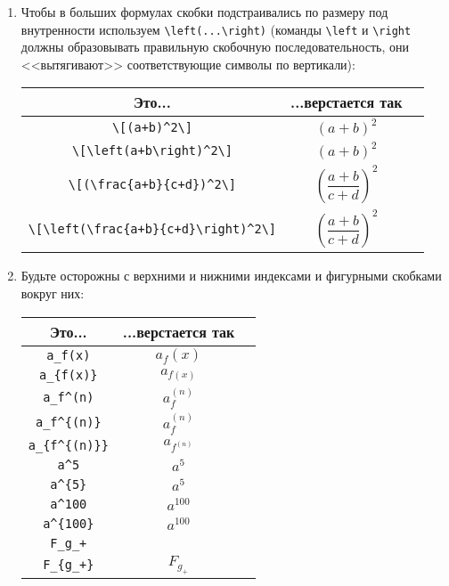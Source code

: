 \begin{enumerate}
\item
	Чтобы в больших формулах скобки подстраивались по размеру под внутренности
	используем \verb'\left(...\right)'
	(команды \verb'\left' и \verb'\right' должны образовывать правильную скобочную последовательность,
	они <<вытягивают>> соответствующие символы по вертикали):
	\begin{center}\begin{tabular}{|c|c|c|}
		\hline Это... & ...верстается так & \\
		\hline \verb'\[(a+b)^2\]'                        & \begin{minipage}{3cm}\[(a+b)^2\]\end{minipage} \ok \\
		\hline \verb'\[\left(a+b\right)^2\]'             & \begin{minipage}{3cm}\[\left(a+b\right)^2\]\end{minipage} \ok \\
		\hline \verb'\[(\frac{a+b}{c+d})^2\]'            & \begin{minipage}{3cm}\[(\frac{a+b}{c+d})^2\]\end{minipage} \bad \\
		\hline \verb'\[\left(\frac{a+b}{c+d}\right)^2\]' & \begin{minipage}{3cm}\[\left(\frac{a+b}{c+d}\right)^2\]\end{minipage} \ok \\
		\hline
	\end{tabular}\end{center}

\item
	Будьте осторожны с верхними и нижними индексами и фигурными скобками вокруг них:
	\begin{center}\begin{tabular}{|c|c|c|}
		\hline Это... & ...верстается так & \\
		\hline \verb'a_f(x)'      & $a_f(x)$ \bad \\
		\hline \verb'a_{f(x)}'    & $a_{f(x)}$ \ok \\
		\hline \verb'a_f^(n)'     & $a_f^(n)$ \bad \\
		\hline \verb'a_f^{(n)}'   & $a_f^{(n)}$ \bad \\
		\hline \verb'a_{f^{(n)}}' & $a_{f^{(n)}}$ \ok \\
		\hline \verb'a^5'         & $a^5$ \ok \\
		\hline \verb'a^{5}'       & $a^{5}$ \ok \\
		\hline \verb'a^100'       & $a^100$ \bad \\
		\hline \verb'a^{100}'     & $a^{100}$ \ok \\
		\hline \verb'F_g_+'       & \bad \\
		\hline \verb'F_{g_+}'     & $F_{g_+}$ \ok \\
		\hline
	\end{tabular}\end{center}


\end{enumerate}
